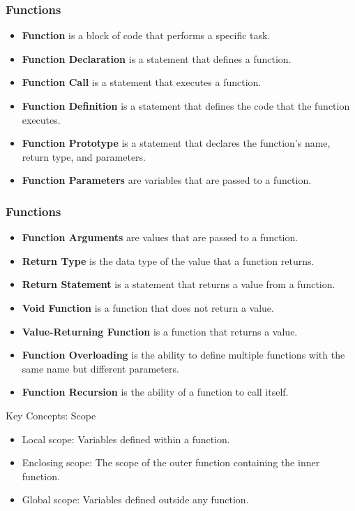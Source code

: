 \begin{frame}
    \frametitle{Functions}
\begin{itemize}
    \item \textbf{Function} is a block of code that performs a specific task.
    \item \textbf{Function Declaration} is a statement that defines a function.
    \item \textbf{Function Call} is a statement that executes a function.
    \item \textbf{Function Definition} is a statement that defines the code that the function executes.
    \item \textbf{Function Prototype} is a statement that declares the function's name, return type, and parameters.
    \item \textbf{Function Parameters} are variables that are passed to a function.
\end{itemize}
\end{frame}
    
\begin{frame}
    \frametitle{Functions}
    \begin{itemize}
    \item \textbf{Function Arguments} are values that are passed to a function.
    \item \textbf{Return Type} is the data type of the value that a function returns.
    \item \textbf{Return Statement} is a statement that returns a value from a function.
    \item \textbf{Void Function} is a function that does not return a value.
    \item \textbf{Value-Returning Function} is a function that returns a value.
    \item \textbf{Function Overloading} is the ability to define multiple functions with the same name but different parameters.
    \item \textbf{Function Recursion} is the ability of a function to call itself.
    \end{itemize}
\end{frame}

%     

\begin{frame}{Key Concepts: Scope}
    \begin{itemize}
      \item Local scope: Variables defined within a function.
      \item Enclosing scope: The scope of the outer function containing the inner function.
      \item Global scope: Variables defined outside any function.
    \end{itemize}
  \end{frame}

